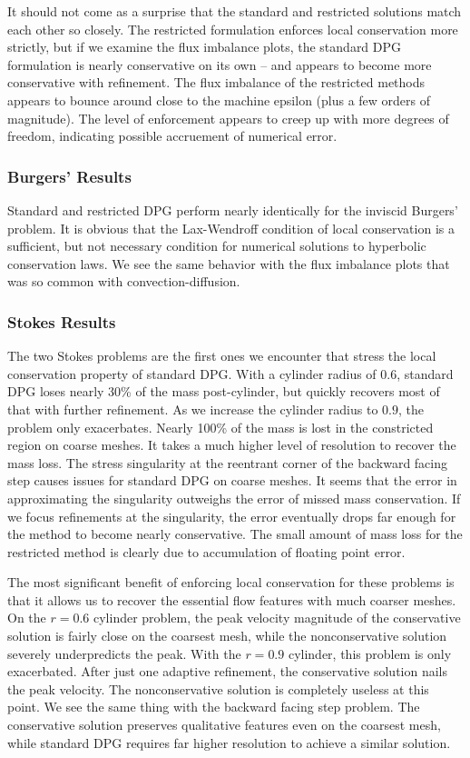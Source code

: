 \documentclass[Proposal.tex]{subfiles}
\begin{document}
It should not come as a surprise that the standard and restricted
solutions match each other so closely. The restricted formulation
enforces local conservation more strictly, but if we examine the flux
imbalance plots, the standard DPG formulation is nearly conservative on its
own -- and appears to become more conservative with refinement. The flux
imbalance of the restricted methods appears to bounce around close to the
machine epsilon (plus a few orders of magnitude). The level of enforcement
appears to creep up with more degrees of freedom, indicating possible
accruement of numerical error.

\subsubsection{Burgers' Results}
Standard and restricted DPG perform nearly identically for the
inviscid Burgers' problem. It is obvious that the Lax-Wendroff condition of
local conservation is a sufficient, but not necessary condition for numerical
solutions to hyperbolic conservation laws. We see the same behavior with the
flux imbalance plots that was so common with convection-diffusion.

\subsubsection{Stokes Results}
The two Stokes problems are the first ones we encounter that stress the local
conservation property of standard DPG. With a cylinder radius of $0.6$,
standard DPG loses nearly 30\% of the mass post-cylinder, but quickly recovers
most of that with further refinement. As we increase the cylinder radius to
$0.9$, the problem only exacerbates. Nearly 100\% of the mass is lost in the
constricted region on coarse meshes. It takes a much higher level of
resolution to recover the mass loss. The stress singularity at the reentrant
corner of the backward facing step causes issues for standard DPG on coarse
meshes. It seems that the error in approximating the singularity outweighs the
error of missed mass conservation. If we focus refinements at the singularity,
the error eventually drops far enough for the method to become nearly
conservative.
The small amount of mass loss for the restricted method is clearly due to
accumulation of floating point error.

The most significant benefit of enforcing local conservation for these
problems is that it allows us to recover the essential flow features with much
coarser meshes. On the $r=0.6$ cylinder problem, the peak velocity magnitude
of the conservative solution is fairly close on the coarsest mesh, while the
nonconservative solution severely underpredicts the peak. With the $r=0.9$
cylinder, this problem is only exacerbated. After just one adaptive
refinement, the conservative solution nails the peak velocity. The
nonconservative solution is completely useless at this point. We see the same
thing with the backward facing step problem. The conservative solution preserves
qualitative features even on the coarsest mesh, while standard DPG requires far higher resolution
to achieve a similar solution. 
\end{document}
